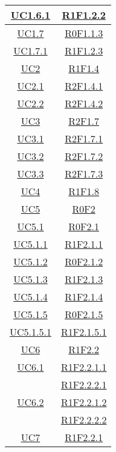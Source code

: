 \begin{longtable}{|c|c|}
	\hline
	\hyperlink{UC1.6.1}{UC1.6.1} & \hyperlink{R1F1.2.2}{R1F1.2.2}\\
	\hline
	\hyperlink{UC1.7}{UC1.7} & \hyperlink{R0F1.1.3}{R0F1.1.3}\\
	\hline
	\hyperlink{UC1.7.1}{UC1.7.1} & \hyperlink{R1F1.2.3}{R1F1.2.3}\\
	\hline
	\hyperlink{UC2}{UC2} & \hyperlink{R1F1.4}{R1F1.4}\\
	\hline
	\hyperlink{UC2.1}{UC2.1} & \hyperlink{R2F1.4.1}{R2F1.4.1}\\
	\hline
	\hyperlink{UC2.2}{UC2.2} & \hyperlink{R2F1.4.2}{R2F1.4.2}\\
	\hline
	\hyperlink{UC3}{UC3} & \hyperlink{R2F1.7}{R2F1.7}\\
	\hline
	\hyperlink{UC3.1}{UC3.1} & \hyperlink{R2F1.7.1}{R2F1.7.1}\\
	\hline
	\hyperlink{UC3.2}{UC3.2} & \hyperlink{R2F1.7.2}{R2F1.7.2}\\
	\hline
	\hyperlink{UC3.3}{UC3.3} & \hyperlink{R2F1.7.3}{R2F1.7.3}\\
	\hline
	\hyperlink{UC4}{UC4} & \hyperlink{R1F1.8}{R1F1.8}\\
	\hline
	\hyperlink{UC5}{UC5} & \hyperlink{R0F2}{R0F2}\\
	\hline
	\hyperlink{UC5.1}{UC5.1} & \hyperlink{R0F2.1}{R0F2.1}\\
	\hline
	\hyperlink{UC5.1.1}{UC5.1.1} & \hyperlink{R1F2.1.1}{R1F2.1.1}\\
	\hline
	\hyperlink{UC5.1.2}{UC5.1.2} & \hyperlink{R0F2.1.2}{R0F2.1.2}\\
	\hline
	\hyperlink{UC5.1.3}{UC5.1.3} & \hyperlink{R1F2.1.3}{R1F2.1.3}\\
	\hline
	\hyperlink{UC5.1.4}{UC5.1.4} & \hyperlink{R1F2.1.4}{R1F2.1.4}\\
	\hline
	\hyperlink{UC5.1.5}{UC5.1.5} & \hyperlink{R0F2.1.5}{R0F2.1.5}\\
	\hline
	\hyperlink{UC5.1.5.1}{UC5.1.5.1} & \hyperlink{R1F2.1.5.1}{R1F2.1.5.1}\\
	\hline
	\hyperlink{UC6}{UC6} & \hyperlink{R1F2.2}{R1F2.2}\\
	\hline
	\hyperlink{UC6.1}{UC6.1} & \hyperlink{R1F2.2.1.1}{R1F2.2.1.1}\\
	& \hyperlink{R1F2.2.2.1}{R1F2.2.2.1}\\
	\hline
	\hyperlink{UC6.2}{UC6.2} & \hyperlink{R1F2.2.1.2}{R1F2.2.1.2}\\
	& \hyperlink{R1F2.2.2.2}{R1F2.2.2.2}\\
	\hline
	\hyperlink{UC7}{UC7} & \hyperlink{R1F2.2.1}{R1F2.2.1}\\

\end{longtable}
